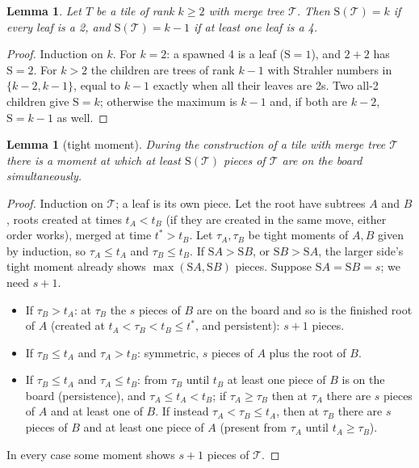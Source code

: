 \documentclass[11pt]{article}
\newtheorem{lemma}[theorem]{Lemma}
\theoremstyle{definition}
\theoremstyle{remark}
\newcommand{\Str}{\mathrm{S}}
\begin{document}
\begin{lemma}\label{lem:strahler}
Let $T$ be a tile of rank $k\ge2$ with merge tree $\mathcal T$. Then
$\Str(\mathcal T)=k$ if every leaf is a 2, and $\Str(\mathcal T)=k-1$
if at least one leaf is a 4.
\end{lemma}
\begin{proof}
Induction on $k$. For $k=2$: a spawned 4 is a leaf ($\Str=1$), and
$2+2$ has $\Str=2$. For $k>2$ the children are trees of rank $k-1$ with
Strahler numbers in $\{k-2,k-1\}$, equal to $k-1$ exactly when all their
leaves are 2s. Two all-2 children give $\Str=k$; otherwise the maximum is
$k-1$ and, if both are $k-2$, $\Str=k-1$ as well.
\end{proof}

\begin{lemma}[tight moment]\label{lem:tight}
During the construction of a tile with merge tree $\mathcal T$ there is a
moment at which at least $\Str(\mathcal T)$ pieces of $\mathcal T$ are on
the board simultaneously.
\end{lemma}
\begin{proof}
Induction on $\mathcal T$; a leaf is its own piece. Let the root have
subtrees $A$ and $B$, roots created at times $t_A<t_B$ (if they are
created in the same move, either order works), merged at time $t^*>t_B$.
Let $\tau_A,\tau_B$ be tight moments of $A,B$ given by induction, so
$\tau_A\le t_A$ and $\tau_B\le t_B$. If $\Str A>\Str B$, or $\Str B>\Str A$,
the larger side's tight moment already shows $\max(\Str A,\Str B)$ pieces.
Suppose $\Str A=\Str B=s$; we need $s+1$.
\begin{itemize}[nosep]
\item If $\tau_B>t_A$: at $\tau_B$ the $s$ pieces of $B$ are on the board
and so is the finished root of $A$ (created at $t_A<\tau_B<t_B\le t^*$,
and persistent): $s+1$ pieces.
\item If $\tau_B\le t_A$ and $\tau_A>t_B$: symmetric, $s$ pieces of $A$
plus the root of $B$.
\item If $\tau_B\le t_A$ and $\tau_A\le t_B$: from $\tau_B$ until $t_B$
at least one piece of $B$ is on the board (persistence), and $\tau_A\le
t_A<t_B$; if $\tau_A\ge\tau_B$ then at $\tau_A$ there are $s$ pieces of $A$
and at least one of $B$. If instead $\tau_A<\tau_B\le t_A$, then at
$\tau_B$ there are $s$ pieces of $B$ and at least one piece of $A$
(present from $\tau_A$ until $t_A\ge\tau_B$).
\end{itemize}
In every case some moment shows $s+1$ pieces of $\mathcal T$.
\end{proof}
\end{document}
